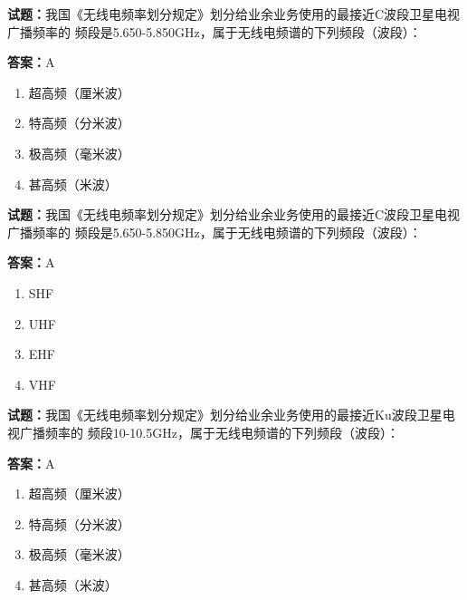 \documentclass{ctexbook}
\begin{document}
\textbf{试题：}我国《无线电频率划分规定》划分给业余业务使用的最接近C波段卫星电视广播频率的
频段是5.650-5.850GHz，属于无线电频谱的下列频段（波段）： 

\textbf{答案：}A 

\begin{enumerate}[leftmargin=3em]
  \item 超高频（厘米波） 

  \item 特高频（分米波） 

  \item 极高频（毫米波） 

  \item 甚高频（米波） 

\end{enumerate}






\vspace{1em}

\textbf{试题：}我国《无线电频率划分规定》划分给业余业务使用的最接近C波段卫星电视广播频率的
频段是5.650-5.850GHz，属于无线电频谱的下列频段（波段）： 

\textbf{答案：}A 

\begin{enumerate}[leftmargin=3em]
  \item SHF 

  \item UHF 

  \item EHF 

  \item VHF 

\end{enumerate}





\vspace{1em}

\textbf{试题：}我国《无线电频率划分规定》划分给业余业务使用的最接近Ku波段卫星电视广播频率的
频段10-10.5GHz，属于无线电频谱的下列频段（波段）： 

\textbf{答案：}A 

\begin{enumerate}[leftmargin=3em]
  \item 超高频（厘米波） 

  \item 特高频（分米波） 

  \item 极高频（毫米波） 

  \item 甚高频（米波） 

\end{enumerate}
\end{document}
